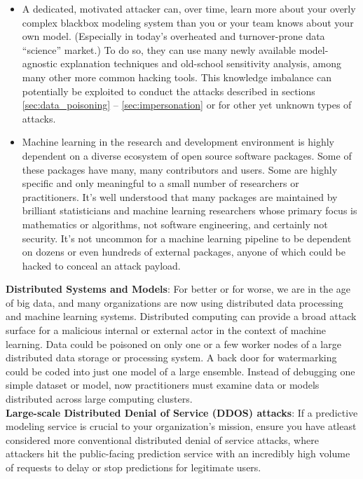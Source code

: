 \documentclass[fleqn]{article}
\begin{document}
\begin{itemize}

\item A dedicated, motivated attacker can, over time, learn more about your overly complex blackbox modeling system than you or your team knows about your own model. (Especially in today's overheated and turnover-prone data ``science'' market.) To do so, they can use many newly available model-agnostic explanation techniques and old-school sensitivity analysis, among many other more common hacking tools. This knowledge imbalance can potentially be exploited to conduct the attacks described in sections \ref{sec:data_poisoning} -- \ref{sec:impersonation} or for other yet unknown types of attacks. 

\item Machine learning in the research and development environment is highly dependent on a diverse ecosystem of open source software packages. Some of these packages have many, many contributors and users. Some are highly specific and only meaningful to a small number of researchers or practitioners. It's well understood that many packages are maintained by brilliant statisticians and machine learning researchers whose primary focus is mathematics or algorithms, not software engineering, and certainly not security. It's not uncommon for a machine learning pipeline to be dependent on dozens or even hundreds of external packages, anyone of which could be hacked to conceal an attack payload.
 
\end{itemize}

\noindent\textbf{Distributed Systems and Models}: For better or for worse, we are in the age of big data, and many organizations are now using distributed data processing and machine learning systems. Distributed computing can provide a broad attack surface for a malicious internal or external actor in the context of machine learning. Data could be poisoned on only one or a few worker nodes of a large distributed data storage or processing system. A back door for watermarking could be coded into just one model of a large ensemble. Instead of debugging one simple dataset or model, now practitioners must examine data or models distributed across large computing clusters.\\

\noindent\textbf{Large-scale Distributed Denial of Service (DDOS) attacks}: If a predictive modeling service is crucial to your organization's mission, ensure you have atleast considered more conventional distributed denial of service attacks, where attackers hit the public-facing prediction service with an incredibly high volume of requests to delay or stop predictions for legitimate users.
\end{document}
